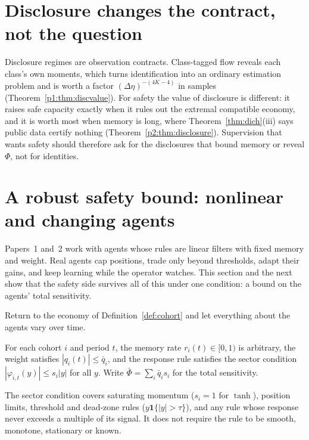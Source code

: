 \section{Disclosure changes the contract, not the question}\label{sec:fw_disclosure}

Disclosure regimes are observation contracts. Class-tagged flow reveals each class's own moments, which turns identification into an ordinary estimation problem and is worth a factor $(\Delta\eta)^{-(4K-4)}$ in samples (Theorem~\ref{p1:thm:discvalue}). For safety the value of disclosure is different: it raises safe capacity exactly when it rules out the extremal compatible economy, and it is worth most when memory is long, where Theorem~\ref{thm:dich}(iii) says public data certify nothing (Theorem~\ref{p2:thm:disclosure}). Supervision that wants safety should therefore ask for the disclosures that bound memory or reveal $\Phi$, not for identities.

\section{A robust safety bound: nonlinear and changing agents}\label{sec:bl_robust}

Papers~1 and~2 work with agents whose rules are linear filters with fixed memory and weight. Real agents cap positions, trade only beyond thresholds, adapt their gains, and keep learning while the operator watches. This section and the next show that the safety side survives all of this under one condition: a bound on the agents' total sensitivity.


Return to the economy of Definition~\ref{def:cohort} and let everything about the agents vary over time.

\begin{assumption}\label{ass:sector}
For each cohort $i$ and period $t$, the memory rate $r_i(t)\in[0,1)$ is arbitrary, the weight satisfies $|q_i(t)|\le\bar q_i$, and the response rule satisfies the sector condition $|\varphi_{i,t}(y)|\le s_i|y|$ for all $y$. Write $\bar\Phi=\sum_i\bar q_i s_i$ for the total sensitivity.
\end{assumption}

The sector condition covers saturating momentum ($s_i=1$ for $\tanh$), position limits, threshold and dead-zone rules ($y\mathbf 1\{|y|>\tau\}$), and any rule whose response never exceeds a multiple of its signal. It does not require the rule to be smooth, monotone, stationary or known.

